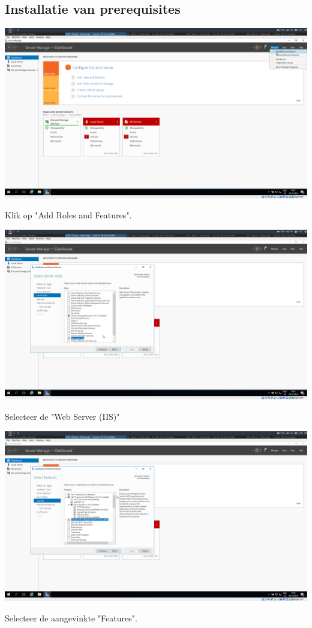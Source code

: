 \documentclass[a4paper]{article}
\begin{document}
\subsection{Installatie van prerequisites}
\begin{center}
	\includegraphics[width=15cm]{Pictures/SCCM/3/1543499830.png}
	
	Klik op "Add Roles and Features".
\end{center}
\begin{center}
	\includegraphics[width=15cm]{Pictures/SCCM/3/1543499848.png}
	
	Selecteer de "Web Server (IIS)"
\end{center}
\begin{center}
	\includegraphics[width=15cm]{Pictures/SCCM/3/1543499895.png}
	
	Selecteer de aangevinkte "Features".
\end{center}
\end{document}
